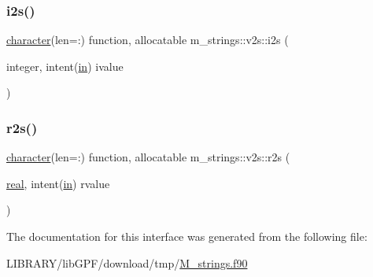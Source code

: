 \mbox{\label{interfacem__strings_1_1v2s_a08eee3b78b507ff8e07060cea394e87d}} 
\subsubsection{\texorpdfstring{i2s()}{i2s()}}
{\footnotesize\ttfamily \hyperlink{option__stopwatch_83_8txt_abd4b21fbbd175834027b5224bfe97e66}{character}(len=\+:) function, allocatable m\+\_\+strings\+::v2s\+::i2s (\begin{DoxyParamCaption}\item[{integer, intent(\hyperlink{M__journal_83_8txt_afce72651d1eed785a2132bee863b2f38}{in})}]{ivalue }\end{DoxyParamCaption})\hspace{0.3cm}{\ttfamily [private]}}

\mbox{\label{interfacem__strings_1_1v2s_a207ea79b86bbc61c1336a9ce92d8e24d}} 
\subsubsection{\texorpdfstring{r2s()}{r2s()}}
{\footnotesize\ttfamily \hyperlink{option__stopwatch_83_8txt_abd4b21fbbd175834027b5224bfe97e66}{character}(len=\+:) function, allocatable m\+\_\+strings\+::v2s\+::r2s (\begin{DoxyParamCaption}\item[{\hyperlink{read__watch_83_8txt_abdb62bde002f38ef75f810d3a905a823}{real}, intent(\hyperlink{M__journal_83_8txt_afce72651d1eed785a2132bee863b2f38}{in})}]{rvalue }\end{DoxyParamCaption})\hspace{0.3cm}{\ttfamily [private]}}



The documentation for this interface was generated from the following file\+:\begin{DoxyCompactItemize}
\item 
L\+I\+B\+R\+A\+R\+Y/lib\+G\+P\+F/download/tmp/\hyperlink{M__strings_8f90}{M\+\_\+strings.\+f90}\end{DoxyCompactItemize}
